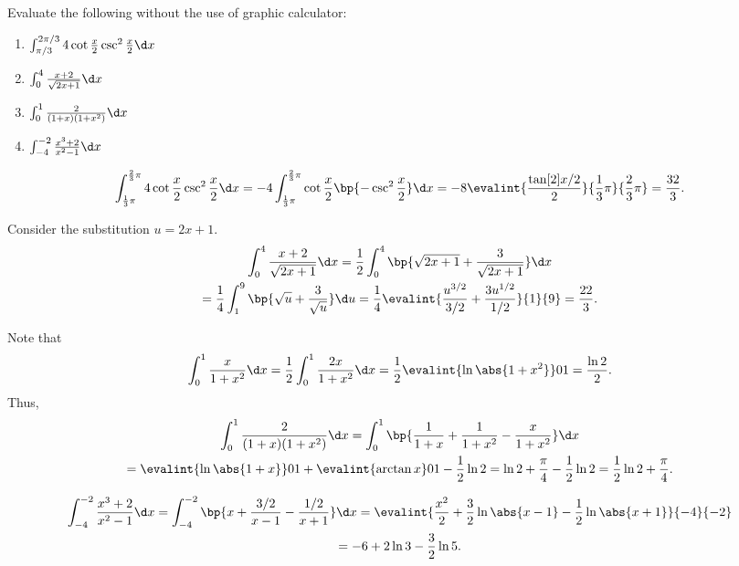 \begin{problem}
    Evaluate the following without the use of graphic calculator:

    \begin{enumerate}
        \item $\int_{\pi/3}^{2\pi/3} 4\cot\frac{x}2 \csc^2\frac{x}2 \d x$
        \item $\int_0^4 \frac{x+2}{\sqrt{2x+1}} \d x$
        \item $\int_0^1 \frac2{(1+x)(1+x^2)} \d x$
        \item $\int_{-4}^{-2} \frac{x^3 + 2}{x^2 - 1} \d x$
    \end{enumerate}
\end{problem}
\begin{solution}
    \begin{ppart}
        \[\int_{\frac13 \pi}^{\frac23 \pi} 4\cot\frac{x}2 \csc^2\frac{x}2 \d x = -4\int_{\frac13 \pi}^{\frac23 \pi} \cot\frac{x}2 \bp{-\csc^2 \frac{x}2} \d x = -8\evalint{\frac{\tan[2]{x/2}}2}{\frac13 \pi}{\frac23 \pi} = \frac{32}3.\]
    \end{ppart}
    \begin{ppart}
        Consider the substitution $u = 2x + 1$.
        \begin{gather*}
            \int_0^4 \frac{x+2}{\sqrt{2x+1}} \d x = \frac12 \int_0^4 \bp{\sqrt{2x+1} + \frac3{\sqrt{2x +1}}} \d x \\
            = \frac14 \int_1^9 \bp{\sqrt{u} + \frac3{\sqrt{u}}} \d u = \frac14 \evalint{\frac{u^{3/2}}{3/2} + \frac{3u^{1/2}}{1/2}}{1}{9} = \frac{22}3.
        \end{gather*}
    \end{ppart}
    \begin{ppart}
        Note that \[\int_0^1 \frac{x}{1 + x^2} \d x = \frac12 \int_0^1 \frac{2x}{1 + x^2} \d x = \frac12 \evalint{\ln \abs{1 + x^2}}01 = \frac{\ln 2}2.\] Thus,
        \begin{gather*}
            \int_0^1 \frac2{(1+x)(1+x^2)} \d x = \int_0^1 \bp{\frac1{1+x} + \frac1{1+x^2} - \frac{x}{1 + x^2}}\d x \\
            = \evalint{\ln \abs{1 + x}}01 + \evalint{\arctan x}01 - \frac12 \ln 2 = \ln 2 + \frac{\pi}4 - \frac12 \ln 2 = \frac12 \ln 2 + \frac\pi4.
        \end{gather*}
    \end{ppart}
    \begin{ppart}
        \begin{gather*}
            \int_{-4}^{-2} \frac{x^3 + 2}{x^2 - 1} \d x = \int_{-4}^{-2} \bp{x + \frac{3/2}{x-1} - \frac{1/2}{x+1}} \d x = \evalint{\frac{x^2}2 + \frac32 \ln \abs{x-1} - \frac12 \ln \abs{x+1}}{-4}{-2} \\
            = -6 + 2\ln3 - \frac32 \ln 5.
        \end{gather*}
    \end{ppart}
\end{solution}

